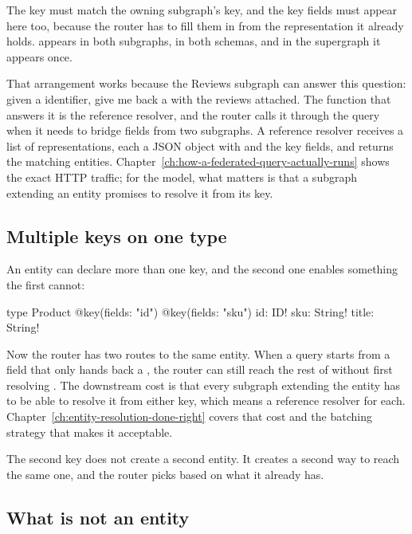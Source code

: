 The key must match the owning subgraph's key, and the key fields must appear
here too, because the router has to fill them in from the representation it
already holds.  appears in both subgraphs, in both schemas, and in the
supergraph it appears once.

%
That arrangement works because the Reviews subgraph can answer this question:
given a  identifier, give me back a  with the
reviews attached. The function that answers it is the reference resolver, and
the router calls it through the  query when it needs to bridge
fields from two subgraphs. A reference resolver receives a list of
representations, each a JSON object with  and the key fields,
and returns the matching entities. Chapter~\ref{ch:how-a-federated-query-actually-runs}
shows the exact HTTP traffic; for the model, what matters is that a subgraph
extending an entity promises to resolve it from its key.

\subsection*{Multiple keys on one type}

%
An entity can declare more than one key, and the second one enables something
the first cannot:

\begin{graphqlsdl}
type Product @key(fields: "id") @key(fields: "sku") {
  id: ID!
  sku: String!
  title: String!
}
\end{graphqlsdl}

Now the router has two routes to the same entity. When a query starts from a
field that only hands back a , the router can still reach the rest of
 without first resolving . The downstream cost is that
every subgraph extending the entity has to be able to resolve it from either
key, which means a reference resolver for each. Chapter~\ref{ch:entity-resolution-done-right}
covers that cost and the batching strategy that makes it acceptable.

The second key does not create a second entity. It creates a second way to reach
the same one, and the router picks based on what it already has.

\subsection*{What is not an entity}

